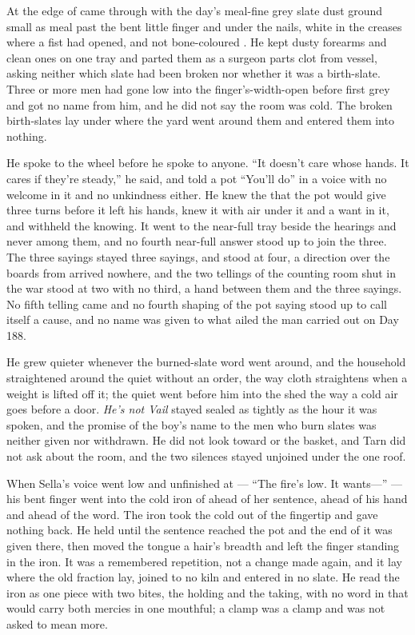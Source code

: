 At the edge of   came through with the day's meal-fine grey slate dust ground small as meal past the bent little finger and under the nails, white in the creases where a fist had opened, and not bone-coloured . He kept dusty forearms and clean ones on one tray and parted them as a surgeon parts clot from vessel, asking neither which slate had been broken nor whether it was a birth-slate. Three or more men had gone low into the finger's-width-open  before first grey and got no name from him, and he did not say the room was cold. The broken birth-slates lay under  where the yard went around them and entered them into nothing.

He spoke to the wheel before he spoke to anyone. “It doesn't care whose hands. It cares if they're steady,” he said, and told a pot “You'll do” in a voice with no welcome in it and no unkindness either. He knew the  that the pot would give three turns before it left his hands, knew it with air under it and a want in it, and withheld the knowing. It went to the near-full tray beside the hearings and never among them, and no fourth near-full answer stood up to join the three. The three sayings stayed three sayings, and  stood at four, a direction over the boards from  arrived nowhere, and the two tellings of the counting room shut in the war stood at two with no third, a hand between them and the three sayings. No fifth telling came and no fourth shaping of the pot saying stood up to call itself a cause, and no name was given to what ailed the man carried out on Day 188.

He grew quieter whenever the burned-slate word went around, and the household straightened around the quiet without an order, the way cloth straightens when a weight is lifted off it; the quiet went before him into the shed the way a cold air goes before a door. \emph{He's not Vail} stayed sealed as tightly as the hour it was spoken, and the promise of the boy's name to the men who burn slates was neither given nor withdrawn. He did not look toward  or the basket, and Tarn did not ask about the room, and the two silences stayed unjoined under the one roof.

When Sella's voice went low and unfinished at  --- “The fire's low. It wants---” --- his bent finger went into the cold iron of  ahead of her sentence, ahead of his hand and ahead of the word. The iron took the cold out of the fingertip and gave nothing back. He held until the sentence reached the pot and the end of it was given there, then moved the tongue a hair's breadth and left the finger standing in the iron. It was a remembered repetition, not a change made again, and it lay where the old fraction lay, joined to no kiln and entered in no slate. He read the iron as one piece with two bites, the holding and the taking, with no word in  that would carry both mercies in one mouthful; a clamp was a clamp and was not asked to mean more.

